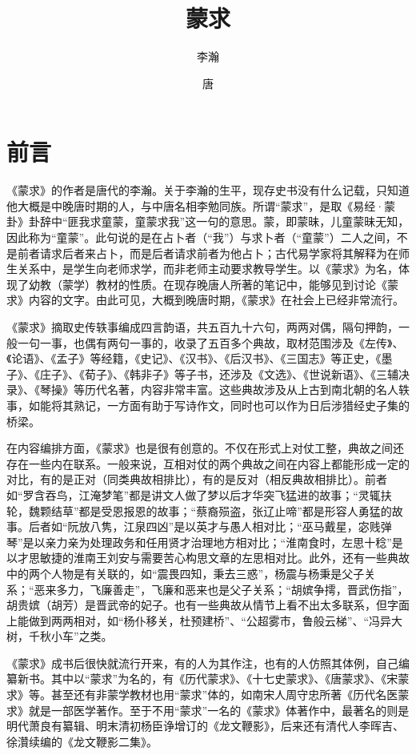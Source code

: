 \documentclass[12pt,UTF8]{ctexbook}
\title{\heiti\zihao{0} 蒙求}
\author{李瀚}
\date{唐}
\begin{document}
\maketitle
\tableofcontents

\frontmatter
\chapter{前言}

《蒙求》的作者是唐代的李瀚。关于李瀚的生平，现存史书没有什么记载，只知道他大概是中晚唐时期的人，与中唐名相李勉同族。所谓“蒙求”，是取《易经·蒙卦》卦辞中“匪我求童蒙，童蒙求我”这一句的意思。蒙，即蒙昧，儿童蒙昧无知，因此称为“童蒙”。此句说的是在占卜者（“我”）与求卜者（“童蒙”）二人之间，不是前者请求后者来占卜，而是后者请求前者为他占卜；古代易学家将其解释为在师生关系中，是学生向老师求学，而非老师主动要求教导学生。以《蒙求》为名，体现了幼教（蒙学）教材的性质。在现存晚唐人所著的笔记中，能够见到讨论《蒙求》内容的文字。由此可见，大概到晚唐时期，《蒙求》在社会上已经非常流行。

《蒙求》摘取史传轶事编成四言韵语，共五百九十六句，两两对偶，隔句押韵，一般一句一事，也偶有两句一事的，收录了五百多个典故，取材范围涉及《左传》、《论语》、《孟子》等经籍，《史记》、《汉书》、《后汉书》、《三国志》等正史，《墨子》、《庄子》、《荀子》、《韩非子》等子书，还涉及《文选》、《世说新语》、《三辅决录》、《琴操》等历代名著，内容非常丰富。这些典故涉及从上古到南北朝的名人轶事，如能将其熟记，一方面有助于写诗作文，同时也可以作为日后涉猎经史子集的桥梁。

在内容编排方面，《蒙求》也是很有创意的。不仅在形式上对仗工整，典故之间还存在一些内在联系。一般来说，互相对仗的两个典故之间在内容上都能形成一定的对比，有的是正对（同类典故相排比），有的是反对（相反典故相排比）。前者如“罗含吞鸟，江淹梦笔”都是讲文人做了梦以后才华突飞猛进的故事；“灵辄扶轮，魏颗结草”都是受恩报恩的故事；“蔡裔殒盗，张辽止啼”都是形容人勇猛的故事。后者如“阮放八隽，江泉四凶”是以英才与愚人相对比；“巫马戴星，宓贱弹琴”是以亲力亲为处理政务和任用贤才治理地方相对比；“淮南食时，左思十稔”是以才思敏捷的淮南王刘安与需要苦心构思文章的左思相对比。此外，还有一些典故中的两个人物是有关联的，如“震畏四知，秉去三惑”，杨震与杨秉是父子关系；“恶来多力，飞廉善走”，飞廉和恶来也是父子关系；“胡嫔争摴，晋武伤指”，胡贵嫔（胡芳）是晋武帝的妃子。也有一些典故从情节上看不出太多联系，但字面上能做到两两相对，如“杨仆移关，杜预建桥”、“公超雾市，鲁般云梯”、“冯异大树，千秋小车”之类。

《蒙求》成书后很快就流行开来，有的人为其作注，也有的人仿照其体例，自己编纂新书。其中以“蒙求”为名的，有《历代蒙求》、《十七史蒙求》、《唐蒙求》、《宋蒙求》等。甚至还有非蒙学教材也用“蒙求”体的，如南宋人周守忠所著《历代名医蒙求》就是一部医学著作。至于不用“蒙求”一名的《蒙求》体著作中，最著名的则是明代萧良有纂辑、明末清初杨臣诤增订的《龙文鞭影》，后来还有清代人李晖吉、徐灒续编的《龙文鞭影二集》。
\end{document}
